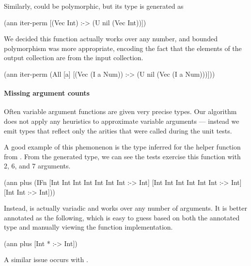 Similarly,  could be polymorphic, 
but its type is generated as

\begin{cljlisting}
(ann iter-perm [(Vec Int) :-> (U nil (Vec Int))])
\end{cljlisting}

We decided this function actually works over any number,
and bounded polymorphism was more appropriate, encoding
the fact that the elements of the output collection
are from the input collection.

\begin{cljlisting}
(ann iter-perm (All [a] [(Vec (I a Num)) :-> (U nil (Vec (I a Num)))]))
\end{cljlisting}
%

\paragraph{Missing argument counts}
Often variable argument functions are given very precise types.
Our algorithm does not apply any heuristics to approximate
variable arguments --- instead we emit types that reflect
only the arities that were called during the unit tests.

A good example of this phemonenon is the type inferred
for the  helper function from .
From the generated type, we can see the tests exercise this function with 2, 6,
and 7 arguments.

\begin{cljlisting}
(ann plus
  (IFn [Int Int Int Int Int Int Int :-> Int]
       [Int Int Int Int Int Int :-> Int]
       [Int Int :-> Int]))
\end{cljlisting}

Instead,  is actually variadic and works over any number of arguments.
It is better annotated as the following, which is easy to guess based on
both the annotated type and manually viewing the function implementation.

\begin{cljlisting}
(ann plus [Int * :-> Int])
\end{cljlisting}

A similar issue occurs with .


